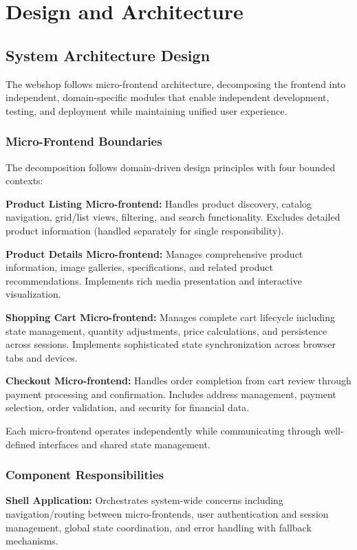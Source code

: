 \documentclass[12pt,a4paper]{report}
\begin{document}
\chapter{Design and Architecture}
\section{System Architecture Design}

The webshop follows micro-frontend architecture, decomposing the frontend into independent, domain-specific modules that enable independent development, testing, and deployment while maintaining unified user experience.

\subsection{Micro-Frontend Boundaries}

The decomposition follows domain-driven design principles with four bounded contexts:

\textbf{Product Listing Micro-frontend:} Handles product discovery, catalog navigation, grid/list views, filtering, and search functionality. Excludes detailed product information (handled separately for single responsibility).

\textbf{Product Details Micro-frontend:} Manages comprehensive product information, image galleries, specifications, and related product recommendations. Implements rich media presentation and interactive visualization.

\textbf{Shopping Cart Micro-frontend:} Manages complete cart lifecycle including state management, quantity adjustments, price calculations, and persistence across sessions. Implements sophisticated state synchronization across browser tabs and devices.

\textbf{Checkout Micro-frontend:} Handles order completion from cart review through payment processing and confirmation. Includes address management, payment selection, order validation, and security for financial data.

Each micro-frontend operates independently while communicating through well-defined interfaces and shared state management.

\subsection{Component Responsibilities}

\textbf{Shell Application:} Orchestrates system-wide concerns including navigation/routing between micro-frontends, user authentication and session management, global state coordination, and error handling with fallback mechanisms.
\end{document}
